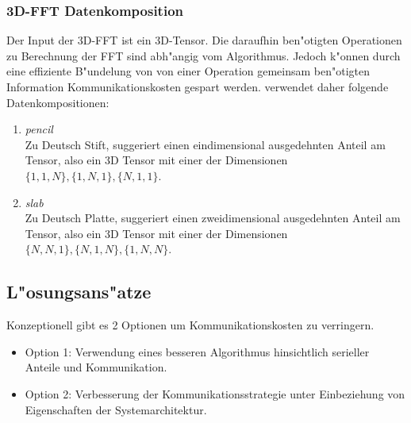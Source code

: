 \subsubsection{3D-FFT Datenkomposition}
Der Input der 3D-FFT ist ein 3D-Tensor. Die daraufhin ben"otigten Operationen zu Berechnung der FFT sind abh"angig vom Algorithmus. Jedoch k"onnen durch eine effiziente B"undelung von von einer Operation gemeinsam ben"otigten Information Kommunikationskosten gespart werden.
\cite{mainpaper} verwendet daher folgende Datenkompositionen:
\begin{enumerate}
	\item \textit{pencil}\\
		Zu Deutsch Stift, suggeriert einen eindimensional ausgedehnten Anteil am Tensor, also ein 3D Tensor mit einer der Dimensionen $\{1,1,N\},\{1,N,1\},\{N,1,1\}$.
	\item \textit{slab}\\
		Zu Deutsch Platte, suggeriert einen zweidimensional ausgedehnten Anteil am Tensor, also ein 3D Tensor mit einer der Dimensionen $\{N,N,1\},\{N,1,N\},\{1,N,N\}$.
\end{enumerate}

\subsection{L"osungsans"atze}
Konzeptionell gibt es 2 Optionen um Kommunikationskosten zu verringern.
\begin{itemize}
	\item Option 1: Verwendung eines besseren Algorithmus hinsichtlich serieller Anteile und Kommunikation.
	\item Option 2: Verbesserung der Kommunikationsstrategie unter Einbeziehung von Eigenschaften der Systemarchitektur.
\end{itemize}

